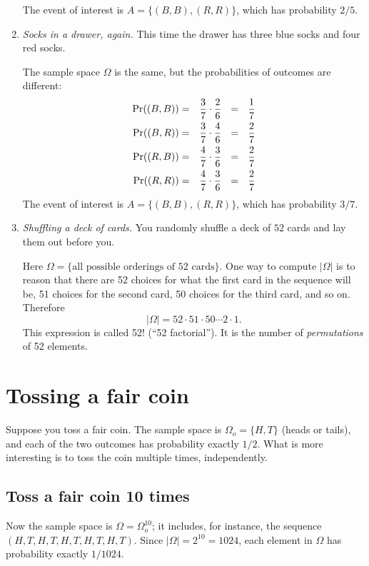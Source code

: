 \begin{enumerate}
The event of interest is $A = \{(B,B), (R,R)\}$, which has probability $2/5$.

\item {\it Socks in a drawer, again.} This time the drawer has three blue socks and four red socks.

The sample space $\Omega$ is the same, but the probabilities of outcomes are different:
\begin{eqnarray*}
\pr((B,B)) & = & \frac{3}{7} \cdot \frac{2}{6} \ \ = \ \ \frac{1}{7} \\
\pr((B,R)) & = & \frac{3}{7} \cdot \frac{4}{6} \ \ = \ \ \frac{2}{7} \\
\pr((R,B)) & = & \frac{4}{7} \cdot \frac{3}{6} \ \ = \ \ \frac{2}{7} \\
\pr((R,R)) & = & \frac{4}{7} \cdot \frac{3}{6} \ \ = \ \ \frac{2}{7}
\end{eqnarray*}
The event of interest is $A = \{(B,B), (R,R)\}$, which has probability $3/7$.

\item {\it Shuffling a deck of cards.} You randomly shuffle a deck of $52$ cards and lay them out before you.

Here $\Omega = \{\mbox{all possible orderings of 52 cards}\}$. One way to compute $|\Omega|$ is to reason that there are 52 choices for what the first card in the sequence will be, 51 choices for the second card, 50 choices for the third card, and so on. Therefore
$$ |\Omega| = 52 \cdot 51 \cdot 50 \cdots 2 \cdot 1 .$$
This expression is called 52! (``52 factorial''). It is the number of {\it permutations} of 52 elements.

\end{enumerate}

\section{Tossing a fair coin}
\label{sec:FairCoin}

Suppose you toss a fair coin. The sample space is $\Omega_o = \{H,T\}$ (heads or tails), and each of the two outcomes has probability exactly $1/2$. What is more interesting is to toss the coin multiple times, independently. 

\subsection{Toss a fair coin 10 times}

Now the sample space is $\Omega = \Omega_o^{10}$; it includes, for instance, the sequence $(H,T,H,T,H,T,H,T,H,T)$. Since $|\Omega| = 2^{10} = 1024$, each element in $\Omega$ has probability exactly $1/1024$.

